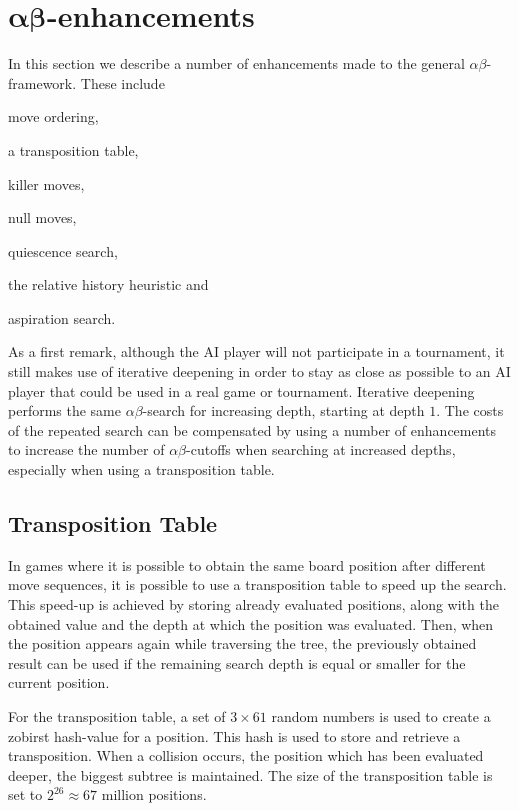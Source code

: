 \documentclass[11pt]{article}
\begin{document}
\section{\texorpdfstring{$\boldsymbol{\alpha\beta}$}{alphabeta}-enhancements}
\label{-sec:alphabeta-enhancements}%
In this section we describe a number of enhancements made to the general $\alpha\beta$-framework. These include \begin{enumerate*}\item move ordering, \item a transposition table, \item killer moves, \item null moves, \item quiescence search, \item the relative history heuristic and \item aspiration search.\end{enumerate*}
As a first remark, although the AI player will not participate in a tournament, it still makes use of iterative deepening in order to stay as close as possible to an AI player that could be used in a real game or tournament. Iterative deepening performs the same $\alpha\beta$-search for increasing depth, starting at depth $1$. The costs of the repeated search can be compensated by using a number of enhancements to increase the number of $\alpha\beta$-cutoffs when searching at increased depths, especially when using a transposition table.

\subsection{Transposition Table}
\label{-subsec:transpositiontable}
In games where it is possible to obtain the same board position after different move sequences, it is possible to use a transposition table to speed up the search. This speed-up is achieved by storing already evaluated positions, along with the obtained value and the depth at which the position was evaluated. Then, when the position appears again while traversing the tree, the previously obtained result can be used if the remaining search depth is equal or smaller for the current position.

For the transposition table, a set of $3\times 61$ random numbers is used to create a zobirst hash-value for a position. This hash is used to store and retrieve a transposition. When a collision occurs, the position which has been evaluated deeper, \ie the biggest subtree is maintained. The size of the transposition table is set to $2^{26}\approx 67$ million positions.
\end{document}

